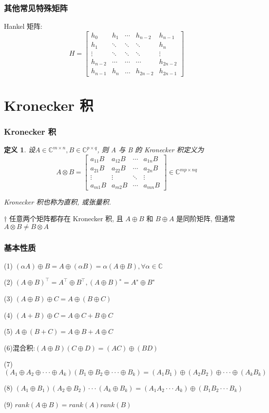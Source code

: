 \documentclass[notheorems,serif]{beamer}
\newcommand{\hei}[1]{{\HEI#1}}
\newtheorem{definition}{\hei{定义}}
\begin{document}
\begin{frame}
\frametitle{其他常见特殊矩阵}
Hankel 矩阵:
$$
H=\left[\begin{array}{ccccc}{h_0} & {h_1} & {\cdots} & {h_{n-2}} & {h_{n-1}} \\ {h_1} & {\ddots} & {\ddots} & {\ddots} & {h_n}\\ {\vdots} & {\ddots} & {\ddots} & {\ddots} & {\vdots}  \\ {h_{n-2}} & {\cdots} & {\cdots} & {\cdots} & {h_{2n-2}} \\ {h_{n-1}} & {h_n} & {\dots} & {h_{2n-2}} & {h_{2n-1}}\end{array}\right]
$$
\end{frame}

\section{Kronecker 积}
\begin{frame}
\frametitle{Kronecker 积}
\begin{definition}
	设$A \in \mathbb{C}^{m \times n}, B \in \mathbb{C}^{p \times q}$, 则 A 与 B 的 Kronecker 积定义为
	$$
	A \otimes B=\left[\begin{array}{cccc}{a_{11} B} & {a_{12} B} & {\cdots} & {a_{1 n} B} \\ {a_{21} B} & {a_{22} B} & {\cdots} & {a_{2 n} B} \\ {\vdots} & {\vdots} & {\ddots} & {\vdots} \\ {a_{m 1} B} & {a_{m 2} B} & {\cdots} & {a_{m n} B}\end{array}\right] \in \mathbb{C}^{m p \times n q}
	$$
	
	Kronecker 积也称为直积, 或张量积.
\end{definition}


$\dagger$ 任意两个矩阵都存在 Kronecker 积, 且 $A \oplus B$ 和 $B \oplus A$ 是同阶矩阵,
但通常 $A \otimes B \neq B \otimes A$
\end{frame}

\begin{frame}
\frametitle{基本性质}
(1) $(αA) \oplus B = A \oplus (αB) = α(A \oplus B), ∀ α \in \mathbb{C}$

(2) $(A \oplus B)^{⊺} = A^{⊺} \oplus B^{⊺}, (A \oplus B)^{∗} = A^{∗} \oplus B^{∗}$

(3) $(A \oplus B) \oplus C = A \oplus (B \oplus C)$

(4) $(A + B) \oplus C = A \oplus C + B \oplus C$

(5) $A \oplus (B + C) = A \oplus B + A \oplus C$

(6)混合积:$ (A \oplus B)(C \oplus D) = (AC) \oplus (BD)$

(7) $(A_1 \oplus A_2 \oplus · · · \oplus A_k)(B_1 \oplus B_2 \oplus · · · \oplus B_k)
= (A_1B_1) \oplus (A_2B_2) \oplus · · · \oplus (A_kB_k)$

(8) $(A_1 \oplus B_1)(A_2 \oplus B_2)· · ·(A_k \oplus B_k)
= (A_1A_2 · · · A_k) \oplus (B_1B_2 · · · B_k)$

(9) $rank(A \oplus B) = rank(A)rank(B)$
\end{frame}
\end{document}
